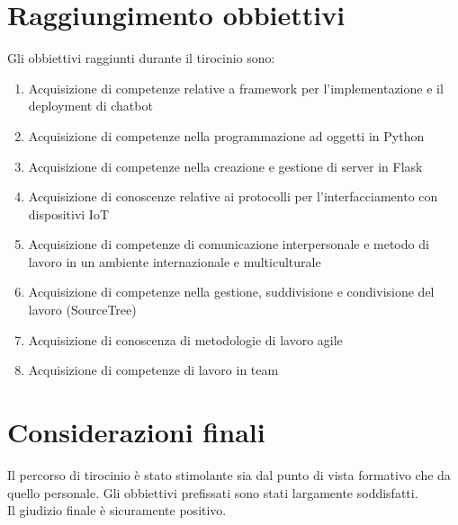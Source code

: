 \documentclass[a4paper,11pt]{article}
\theoremstyle{plain}
\begin{document}
\section*{Raggiungimento obbiettivi}
Gli obbiettivi raggiunti durante il tirocinio sono:
\begin{enumerate}
\item Acquisizione di competenze relative a framework per l'implementazione e il deployment di chatbot 
\item Acquisizione di competenze nella programmazione ad oggetti in Python
\item Acquisizione di competenze nella creazione e gestione di server in Flask
\item Acquisizione di conoscenze relative ai protocolli per l'interfacciamento con dispositivi IoT 
\item Acquisizione di competenze di comunicazione interpersonale e metodo di lavoro in un ambiente internazionale e multiculturale 
\item Acquisizione di competenze nella gestione, suddivisione e condivisione del lavoro (SourceTree)
\item Acquisizione di conoscenza di metodologie di lavoro agile 
\item Acquisizione di competenze di lavoro in team 
\end{enumerate}
\section*{Considerazioni finali}
Il percorso di tirocinio è stato stimolante sia dal punto di vista formativo che da quello personale.
Gli obbiettivi prefissati sono stati largamente soddisfatti.\\
Il giudizio finale è sicuramente positivo.
\end{document}
